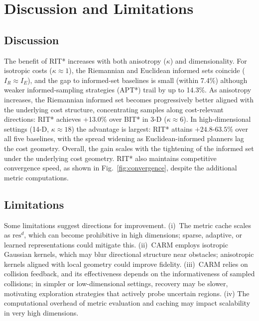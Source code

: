 \documentclass[journal]{IEEEtran}
\newcommand{\revB}[1]{#1}%
\newcommand{\greenrev}[1]{#1}%
\newcommand{\IR}{I_{\!R}}
\newcommand{\IE}{I_{\!E}}
\begin{document}
\section{Discussion and Limitations}\label{sec:conclusion}

\subsection{Discussion}

The benefit of RIT* increases with both anisotropy ($\kappa$) and
dimensionality. For isotropic costs ($\kappa\!\approx\!1$), the
Riemannian and Euclidean informed sets coincide ($\IR \approx \IE$),
and the gap to \revB{informed-set baselines} is small (within 7.4\%) although
weaker informed-sampling strategies (APT*) trail by up to 14.3\%.
As anisotropy increases, the Riemannian informed set \greenrev{becomes progressively better aligned with the underlying cost structure}, concentrating samples along cost-relevant
directions: RIT* achieves +13.0\% over BIT* in 3-D
($\kappa\!\approx\!6$). In high-dimensional
settings (14-D, $\kappa\!\approx\!18$) the advantage is largest:
RIT* attains $+24.8$-$63.5\%$ over all five baselines, with the spread widening as Euclidean-informed planners lag the cost geometry.
Overall, the gain scales with the tightening of the informed set under the underlying cost geometry. RIT* also maintains competitive convergence speed, as shown in Fig.~\ref{fig:convergence}, despite the additional metric computations.

\subsection{Limitations}
Some limitations suggest directions for improvement.
(i)~The metric cache scales as $\mathrm{res}^d$, which can become prohibitive in high dimensions; sparse, adaptive, or learned representations could mitigate this.
(ii)~CARM employs isotropic Gaussian kernels, which may blur directional structure near obstacles; anisotropic kernels aligned with local geometry could improve fidelity.
(iii)~CARM relies on collision feedback, and its effectiveness depends on the informativeness of sampled collisions; in simpler or low-dimensional settings, recovery may be slower, motivating exploration strategies that actively probe uncertain regions. (iv) The computational overhead of metric evaluation and caching may impact scalability in very high dimensions.
\vspace{-4mm}
\end{document}
